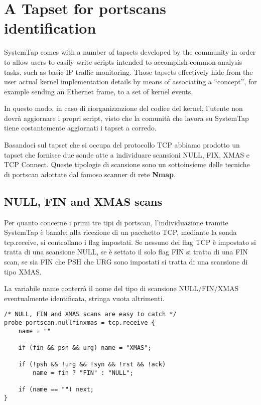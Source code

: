\documentclass[11pt]{article}
\begin{document}
\pagebreak

\section{A Tapset for portscans identification}
\label{ids:portscan}
SystemTap comes with a number of tapsets developed by the community in order to
allow users to easily write scripts intended to accomplish common analysis
tasks, such as basic IP traffic monitoring. Those tapsets effectively hide from
the user actual kernel implementation details by means of associating a
``concept'', for example sending an Ethernet frame, to a set of kernel events.

In questo modo, in caso di riorganizzazione del codice del kernel, l'utente non
dovrà aggiornare i propri script, visto che la comunità che lavora su SystemTap
tiene costantemente aggiornati i tapset a corredo.

Basandoci sul tapset che si occupa del protocollo TCP abbiamo prodotto un
tapset che fornisce due sonde atte a individuare scansioni NULL, FIX, XMAS e
TCP Connect. Queste tipologie di scansione sono un sottoinsieme delle tecniche
di portscan adottate dal famoso scanner di rete \textbf{Nmap}.

\subsection{NULL, FIN and XMAS scans}
Per quanto concerne i primi tre tipi di portscan, l'individuazione tramite
SystemTap è banale: alla ricezione di un pacchetto TCP, mediante la sonda
tcp.receive, si controllano i flag impostati. Se nessuno dei flag TCP è
impostato si tratta di una scansione NULL, se è settato il solo flag FIN si
tratta di una FIN scan, se sia FIN che PSH che URG sono impostati si tratta di
una scansione di tipo XMAS.

La variabile name conterrà il nome del tipo di scansione NULL/FIN/XMAS
eventualmente identificata, stringa vuota altrimenti.

\begin{lstlisting}
/* NULL, FIN and XMAS scans are easy to catch */
probe portscan.nullfinxmas = tcp.receive {
    name = ""

    if (fin && psh && urg) name = "XMAS";

    if (!psh && !urg && !syn && !rst && !ack)
        name = fin ? "FIN" : "NULL";

    if (name == "") next;
}
\end{lstlisting}
\end{document}
